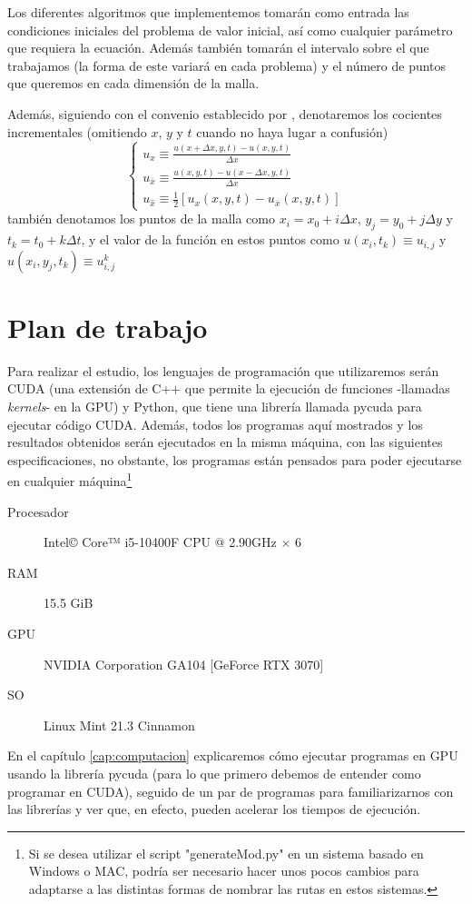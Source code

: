 Los diferentes algoritmos que implementemos tomarán como entrada las condiciones iniciales del problema de valor inicial, así como cualquier parámetro que requiera la ecuación. Además también tomarán el intervalo sobre el que trabajamos (la forma de este variará en cada problema) y el número de puntos que queremos en cada dimensión de la malla.

Además, siguiendo con el convenio establecido por \citet{anummeth}, denotaremos los cocientes incrementales (omitiendo $x$, $y$ y $t$ cuando no haya lugar a confusión)
\[
\begin{cases}
	u_x \equiv \frac{u(x+\Delta x,y,t)-u(x,y,t)}{\Delta x} \\
	u_{\overline{x}} \equiv \frac{u(x,y,t)-u(x-\Delta x,y,t)}{\Delta x} \\
	u_{\hat{x}} \equiv \frac{1}{2}[u_x(x,y,t)-u_{\overline{x}}(x,y,t)]
\end{cases}
\]
también denotamos los puntos de la malla como $x_i=x_0+i\Delta x$, $y_j=y_0+j\Delta y$ y $t_k=t_0+k\Delta t$, y el valor de la función en estos puntos como 
$
u(x_i,t_k) \equiv u_{i,j}$ y $ u(x_i,y_j,t_k) \equiv u^k_{i,j}$


\section{Plan de trabajo}
Para realizar el estudio, los lenguajes de programación que utilizaremos serán CUDA (una extensión de C++ que permite la ejecución de funciones -llamadas \emph{kernels}- en la \ac{GPU}) y Python, que tiene una librería llamada pycuda para ejecutar código \ac{CUDA}. Además, todos los programas aquí mostrados y los resultados obtenidos serán ejecutados en la misma máquina, con las siguientes especificaciones, no obstante, los programas están pensados para poder ejecutarse en cualquier máquina\footnote{Si se desea utilizar el script "generateMod.py" en un sistema basado en Windows o MAC, podría ser necesario hacer unos pocos cambios para adaptarse a las distintas formas de nombrar las rutas en estos sistemas.}

\begin{description}
	\item[Procesador] Intel© Core™ i5-10400F CPU @ 2.90GHz × 6
	\item[RAM] 15.5 GiB
	\item[GPU] NVIDIA Corporation GA104 [GeForce RTX 3070]
	\item[SO] Linux Mint 21.3 Cinnamon
\end{description}

En el capítulo \ref{cap:computacion} explicaremos cómo ejecutar programas en \ac{GPU} usando la librería pycuda (para lo que primero debemos de entender como programar en CUDA), seguido de un par de programas para familiarizarnos con las librerías y ver que, en efecto, pueden acelerar los tiempos de ejecución.


